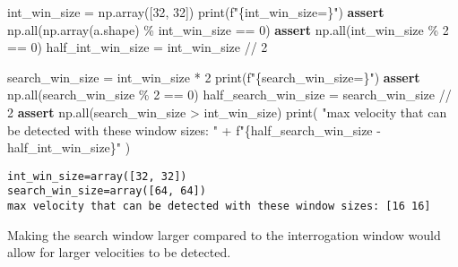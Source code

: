 \documentclass[
  english,
  letterpaper,
  numbers=noendperiod,
  DIV=13]{scrreprt}
\newenvironment{Shaded}{\begin{snugshade}}{\end{snugshade}}
\newcommand{\BuiltInTok}[1]{\textcolor[rgb]{0.00,0.23,0.31}{#1}}
\newcommand{\ControlFlowTok}[1]{\textcolor[rgb]{0.00,0.23,0.31}{\textbf{#1}}}
\newcommand{\DecValTok}[1]{\textcolor[rgb]{0.68,0.00,0.00}{#1}}
\newcommand{\NormalTok}[1]{\textcolor[rgb]{0.00,0.23,0.31}{#1}}
\newcommand{\OperatorTok}[1]{\textcolor[rgb]{0.37,0.37,0.37}{#1}}
\newcommand{\SpecialCharTok}[1]{\textcolor[rgb]{0.37,0.37,0.37}{#1}}
\newcommand{\SpecialStringTok}[1]{\textcolor[rgb]{0.13,0.47,0.30}{#1}}
\newcommand{\StringTok}[1]{\textcolor[rgb]{0.13,0.47,0.30}{#1}}
\begin{document}
\begin{Shaded}
\begin{Highlighting}[]
\NormalTok{int\_win\_size }\OperatorTok{=}\NormalTok{ np.array([}\DecValTok{32}\NormalTok{, }\DecValTok{32}\NormalTok{])}
\BuiltInTok{print}\NormalTok{(}\SpecialStringTok{f"}\SpecialCharTok{\{}\NormalTok{int\_win\_size}\OperatorTok{=}\SpecialCharTok{\}}\SpecialStringTok{"}\NormalTok{)}
\ControlFlowTok{assert}\NormalTok{ np.}\BuiltInTok{all}\NormalTok{(np.array(a.shape) }\OperatorTok{\%}\NormalTok{ int\_win\_size }\OperatorTok{==} \DecValTok{0}\NormalTok{)}
\ControlFlowTok{assert}\NormalTok{ np.}\BuiltInTok{all}\NormalTok{(int\_win\_size }\OperatorTok{\%} \DecValTok{2} \OperatorTok{==} \DecValTok{0}\NormalTok{)}
\NormalTok{half\_int\_win\_size }\OperatorTok{=}\NormalTok{ int\_win\_size }\OperatorTok{//} \DecValTok{2}

\NormalTok{search\_win\_size }\OperatorTok{=}\NormalTok{ int\_win\_size }\OperatorTok{*} \DecValTok{2}
\BuiltInTok{print}\NormalTok{(}\SpecialStringTok{f"}\SpecialCharTok{\{}\NormalTok{search\_win\_size}\OperatorTok{=}\SpecialCharTok{\}}\SpecialStringTok{"}\NormalTok{)}
\ControlFlowTok{assert}\NormalTok{ np.}\BuiltInTok{all}\NormalTok{(search\_win\_size }\OperatorTok{\%} \DecValTok{2} \OperatorTok{==} \DecValTok{0}\NormalTok{)}
\NormalTok{half\_search\_win\_size }\OperatorTok{=}\NormalTok{ search\_win\_size }\OperatorTok{//} \DecValTok{2}
\ControlFlowTok{assert}\NormalTok{ np.}\BuiltInTok{all}\NormalTok{(search\_win\_size }\OperatorTok{\textgreater{}}\NormalTok{ int\_win\_size)}
\BuiltInTok{print}\NormalTok{(}
    \StringTok{"max velocity that can be detected with these window sizes: "}
    \OperatorTok{+} \SpecialStringTok{f"}\SpecialCharTok{\{}\NormalTok{half\_search\_win\_size }\OperatorTok{{-}}\NormalTok{ half\_int\_win\_size}\SpecialCharTok{\}}\SpecialStringTok{"}
\NormalTok{)}
\end{Highlighting}
\end{Shaded}

\begin{verbatim}
int_win_size=array([32, 32])
search_win_size=array([64, 64])
max velocity that can be detected with these window sizes: [16 16]
\end{verbatim}

Making the search window larger compared to the interrogation window
would allow for larger velocities to be detected.
\end{document}
